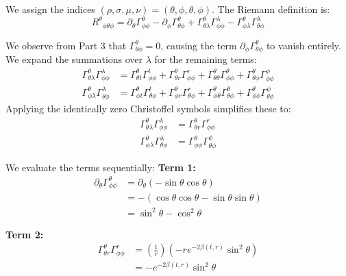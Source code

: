 \documentclass[11pt, a4paper]{report}
\begin{document}
We assign the indices $(\rho, \sigma, \mu, \nu) = (\theta, \phi, \theta, \phi)$. The Riemann definition is:
\begin{equation}
    {R^\theta}_{\phi\theta\phi} = \partial_\theta \Gamma^\theta_{\phi\phi} - \partial_\phi \Gamma^\theta_{\theta\phi} + \Gamma^\theta_{\theta\lambda}\Gamma^\lambda_{\phi\phi} - \Gamma^\theta_{\phi\lambda}\Gamma^\lambda_{\theta\phi}
\end{equation}

We observe from Part 3 that $\Gamma^\theta_{\theta\phi} = 0$, causing the term $\partial_\phi \Gamma^\theta_{\theta\phi}$ to vanish entirely.
We expand the summations over $\lambda$ for the remaining terms:
\begin{align}
    \Gamma^\theta_{\theta\lambda}\Gamma^\lambda_{\phi\phi} &= \Gamma^\theta_{\theta t}\Gamma^t_{\phi\phi} + \Gamma^\theta_{\theta r}\Gamma^r_{\phi\phi} + \Gamma^\theta_{\theta\theta}\Gamma^\theta_{\phi\phi} + \Gamma^\theta_{\theta\phi}\Gamma^\phi_{\phi\phi} \\
    \Gamma^\theta_{\phi\lambda}\Gamma^\lambda_{\theta\phi} &= \Gamma^\theta_{\phi t}\Gamma^t_{\theta\phi} + \Gamma^\theta_{\phi r}\Gamma^r_{\theta\phi} + \Gamma^\theta_{\phi\theta}\Gamma^\theta_{\theta\phi} + \Gamma^\theta_{\phi\phi}\Gamma^\phi_{\theta\phi}
\end{align}
Applying the identically zero Christoffel symbols simplifies these to:
\begin{align}
    \Gamma^\theta_{\theta\lambda}\Gamma^\lambda_{\phi\phi} &= \Gamma^\theta_{\theta r}\Gamma^r_{\phi\phi} \\
    \Gamma^\theta_{\phi\lambda}\Gamma^\lambda_{\theta\phi} &= \Gamma^\theta_{\phi\phi}\Gamma^\phi_{\theta\phi}
\end{align}

We evaluate the terms sequentially:
\textbf{Term 1:}
\begin{align}
    \partial_\theta \Gamma^\theta_{\phi\phi} &= \partial_\theta (-\sin\theta \cos\theta) \nonumber \\
    &= -(\cos\theta \cos\theta - \sin\theta \sin\theta) \nonumber \\
    &= \sin^2\theta - \cos^2\theta
\end{align}

\textbf{Term 2:}
\begin{align}
    \Gamma^\theta_{\theta r}\Gamma^r_{\phi\phi} &= \left( \frac{1}{r} \right) \left( -r e^{-2\beta(t,r)} \sin^2\theta \right) \nonumber \\
    &= -e^{-2\beta(t,r)} \sin^2\theta
\end{align}
\end{document}
